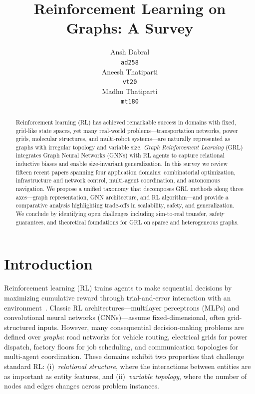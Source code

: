 \documentclass{article}
\title{Reinforcement Learning on Graphs: A Survey}
\author{
  Ansh Dabral \\
  \texttt{ad258} \\
  \And
  Aneesh Thatiparti \\
  \texttt{vt20} \\
  \And
  Madhu Thatiparti \\
  \texttt{mt180} \\
}
\begin{document}
\maketitle

\begin{abstract}
Reinforcement learning (RL) has achieved remarkable success in domains with fixed, grid-like state spaces, yet many real-world problems---transportation networks, power grids, molecular structures, and multi-robot systems---are naturally represented as graphs with irregular topology and variable size. \emph{Graph Reinforcement Learning} (GRL) integrates Graph Neural Networks (GNNs) with RL agents to capture relational inductive biases and enable size-invariant generalization. In this survey we review fifteen recent papers spanning four application domains: combinatorial optimization, infrastructure and network control, multi-agent coordination, and autonomous navigation. We propose a unified taxonomy that decomposes GRL methods along three axes---graph representation, GNN architecture, and RL algorithm---and provide a comparative analysis highlighting trade-offs in scalability, safety, and generalization. We conclude by identifying open challenges including sim-to-real transfer, safety guarantees, and theoretical foundations for GRL on sparse and heterogeneous graphs.
\end{abstract}

\section{Introduction}

Reinforcement learning (RL) trains agents to make sequential decisions by maximizing cumulative reward through trial-and-error interaction with an environment~\cite{sutton2018reinforcement}. Classic RL architectures---multilayer perceptrons (MLPs) and convolutional neural networks (CNNs)---assume fixed-dimensional, often grid-structured inputs. However, many consequential decision-making problems are defined over \emph{graphs}: road networks for vehicle routing, electrical grids for power dispatch, factory floors for job scheduling, and communication topologies for multi-agent coordination. These domains exhibit two properties that challenge standard RL: (i)~\emph{relational structure}, where the interactions between entities are as important as entity features, and (ii)~\emph{variable topology}, where the number of nodes and edges changes across problem instances.
\end{document}

